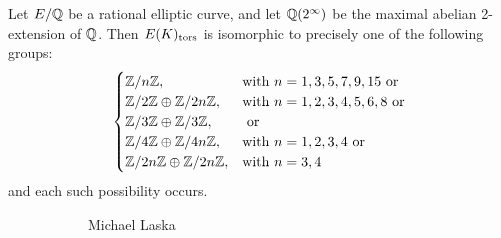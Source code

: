 \begin{frame}[plain]
\footnotesize
\begin{thm}
Let $E/\mathbb{Q}$ be a rational elliptic curve, and let $\mathbb{Q}(2^\infty)$ be the maximal abelian 2-extension of $\mathbb{Q}$. Then $E(K)_{\text{tors}}$ is isomorphic to precisely one of the following groups:
	\[
	\begin{cases}
	\mathbb{Z}/n\mathbb{Z}, & \text{with } n= 1, 3, 5, 7, 9, 15 \text{ or} \\
	\mathbb{Z}/2\mathbb{Z} \oplus \mathbb{Z}/2n\mathbb{Z}, & \text{with } n= 1, 2, 3, 4, 5, 6, 8 \text{ or} \\
	\mathbb{Z}/3\mathbb{Z} \oplus \mathbb{Z}/3\mathbb{Z}, & \text{ or} \\
	\mathbb{Z}/4\mathbb{Z} \oplus \mathbb{Z}/4n\mathbb{Z}, & \text{with } n= 1, 2, 3, 4 \text{ or} \\
	\mathbb{Z}/2n\mathbb{Z} \oplus \mathbb{Z}/2n\mathbb{Z}, & \text{with } n= 3, 4
	\end{cases}
	\]
and each such possibility occurs. 
\end{thm}
	\begin{figure}[h]
	\centering
	\begin{subfigure}{0.30\textwidth}
	\captionsetup{labelformat=empty}
	\centering
	\caption{\scriptsize Michael Laska}
	\end{subfigure}
	\begin{subfigure}{0.30\textwidth}
	\captionsetup{labelformat=empty}
	\centering

\end{subfigure}
\end{figure}
\end{frame}

